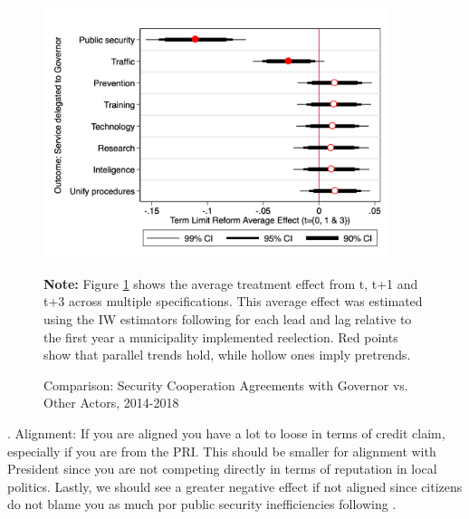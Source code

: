 \documentclass[12pt]{amsart}
\numberwithin{equation}{section}
\theoremstyle{definition}
\theoremstyle{definition}
\theoremstyle{definition}
\begin{document}
 \begin{figure}[H]   
\centering
 \caption{Comparison: Security Cooperation Agreements with Governor vs. Other Actors, 2014-2018}
 \label{fig:services}
\includegraphics[width=0.9\textwidth]{../Figures/services.png}
       \captionsetup{justification=centering}
       
 \textbf{Note:} Figure \ref{fig:services} shows the average treatment effect from t, t+1 and t+3 across multiple specifications. This average effect was estimated using the IW estimators following \citet{abraham_sun_2020} for each lead and lag relative to the first year a municipality implemented reelection. Red points show that parallel trends hold, while hollow ones imply pretrends. 
\end{figure}   

. Alignment: If you are aligned you have a lot to loose in terms of credit claim, especially if you are from the PRI. This should be smaller for alignment with President since you are not competing directly in terms of reputation in local politics. Lastly, we should see a greater negative effect if not aligned since citizens do not blame you as much por public security inefficiencies following \citet{ley_2017}.
\end{document}
